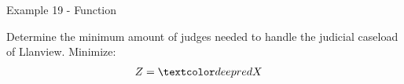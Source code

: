 \begin{frame}{Example 19 - Function}

Determine the minimum amount of judges needed to handle the
judicial caseload of  Llanview. Minimize:
\begin{align*}
    Z &= \colora{X}
\end{align*}

\end{frame}
